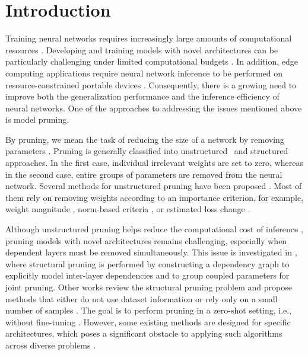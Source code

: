 \cleardoublepage
{}
{}
\section*{Introduction}

Training neural networks requires increasingly large amounts of computational resources \cite{Sevilla2022}. Developing and training models with novel architectures can be particularly challenging under limited computational budgets \cite{Tan2019}. In addition, edge computing applications require neural network inference to be performed on resource-constrained portable devices \cite{BanjanovicMehmedovic2023}. Consequently, there is a growing need to improve both the generalization performance and the inference efficiency of neural networks. One of the approaches to addressing the issues mentioned above is model pruning.

By pruning, we mean the task of reducing the size of a network by removing parameters \cite{Liang2021}. Pruning is generally classified into unstructured~\cite{Liu2021,Wang2020} and structured~\cite{You2019,Ma2023} approaches. In the first case, individual irrelevant weights are set to zero, whereas in the second case, entire groups of parameters are removed from the neural network. Several methods for unstructured pruning have been proposed \cite{inproceedings,Hassibi1992,zeng2019mlprune,Han2015}. Most of them rely on removing weights according to an importance criterion, for example, weight magnitude \cite{Han2015,Lubana2020}, norm-based criteria \cite{He2018}, or estimated loss change \cite{Molchanov2016,Hassibi1992}.

Although unstructured pruning helps reduce the computational cost of inference \cite{Han2015}, pruning models with novel architectures remains challenging, especially when dependent layers must be removed simultaneously. This issue is investigated in \cite{Fang2023}, where structural pruning is performed by constructing a dependency graph to explicitly model inter-layer dependencies and to group coupled parameters for joint pruning. Other works review the structural pruning problem and propose methods that either do not use dataset information \cite{Tanaka2020,Yvinec2021} or rely only on a small number of samples \cite{Tanaka2020,He2022}. The goal is to perform pruning in a zero-shot setting, i.e., without fine-tuning \cite{Chen2021,Liu2022}. However, some existing methods are designed for specific architectures, which poses a significant obstacle to applying such algorithms across diverse problems \cite{Frantar2023,Wang2019}.

